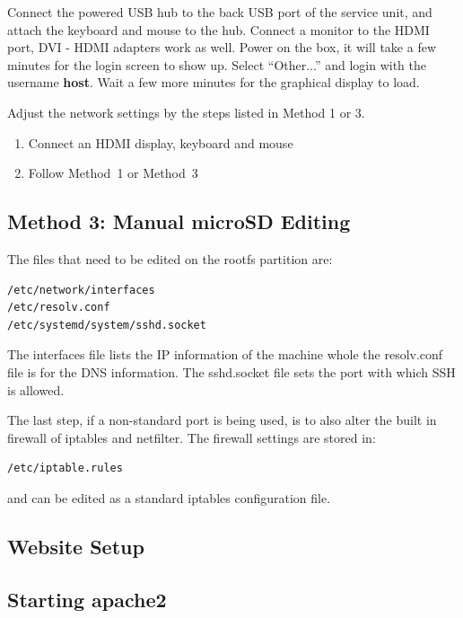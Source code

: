 Connect the powered USB hub to the back USB port of the service unit, and attach the keyboard and mouse to the hub.
Connect a monitor to the HDMI port, DVI - HDMI adapters work as well.
Power on the box, it will take a few minutes for the login screen to show up.
Select ``Other...'' and login with the username \textbf{host}.
Wait a few more minutes for the graphical display to load.

Adjust the network settings by the steps listed in Method 1 or 3.

\begin{enumerate}
\item{Connect an HDMI display, keyboard and mouse}
\item{Follow Method~1 or Method~3}
\end{enumerate}


\subsection*{Method 3: Manual microSD Editing}

The files that need to be edited on the rootfs partition are:

\begin{verbatim}
/etc/network/interfaces
/etc/resolv.conf
/etc/systemd/system/sshd.socket
\end{verbatim}

The interfaces file lists the IP information of the machine whole the resolv.conf file is for the DNS information.
The sshd.socket file sets the port with which SSH is allowed.

The last step, if a non-standard port is being used, is to also alter the built in firewall of iptables and netfilter.
The firewall settings are stored in:

\begin{verbatim}
/etc/iptable.rules
\end{verbatim}

and can be edited as a standard iptables configuration file.

\subsection{Website Setup}
\label{app:gumstix:website}

\subsection*{Starting apache2}

